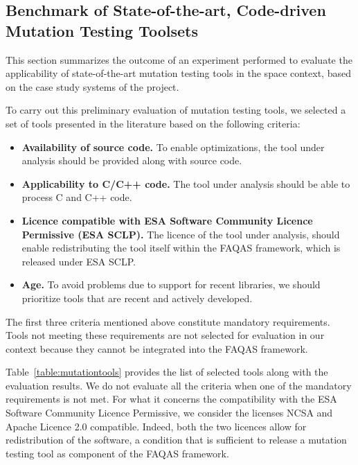 
\subsection{Benchmark of State-of-the-art, Code-driven Mutation Testing Toolsets}
\label{sec:toolsComparison}

This section summarizes the outcome of an experiment performed to evaluate the applicability of state-of-the-art mutation testing tools in the space context, based on the case study systems of the project. 

To carry out this preliminary evaluation of mutation testing tools, we selected a set of tools presented in the literature based on the following criteria:

\begin{itemize}
	\item \textbf{Availability of source code.} To enable optimizations, the tool under analysis should be provided along with source code.
	\item \textbf{Applicability to C/C++ code.} The tool under analysis should be able to process C and C++ code.
	\item \textbf{Licence compatible with ESA Software Community Licence Permissive (ESA SCLP).} The licence of the tool under analysis, should enable redistributing the tool itself within the FAQAS framework, which is released under ESA SCLP.
	\item \textbf{Age.} To avoid problems due to support for recent libraries, we should prioritize tools that are recent and actively developed.
\end{itemize}


The first three criteria mentioned above constitute mandatory requirements. 
Tools not meeting these requirements are not selected for evaluation in our context because they cannot be integrated into the FAQAS framework.



Table~\ref{table:mutationtools} provides the list of selected tools along with the evaluation results. We do not evaluate all the criteria when one of the mandatory requirements is not met.
For what it concerns the compatibility with the ESA Software Community Licence Permissive, we consider the licenses NCSA and Apache Licence 2.0 compatible. 
Indeed, both the two licences allow for redistribution of the software, a condition that is sufficient to release a mutation testing tool as component of the FAQAS framework.

